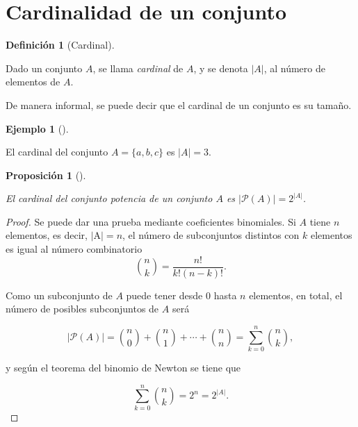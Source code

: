 \documentclass[
  a4paper,
]{scrreport}
\theoremstyle{definition}
\newtheorem{definition}{Definición}[chapter]
\theoremstyle{plain}
\theoremstyle{plain}
\newtheorem{proposition}{Proposición}[chapter]
\theoremstyle{definition}
\theoremstyle{definition}
\newtheorem{example}{Ejemplo}[chapter]
\theoremstyle{plain}
\theoremstyle{remark}
\begin{document}
\hypertarget{cardinalidad-de-un-conjunto}{%
\section{Cardinalidad de un
conjunto}\label{cardinalidad-de-un-conjunto}}

\begin{definition}[Cardinal]\protect\hypertarget{def-cardinal-conjunto}{}\label{def-cardinal-conjunto}

Dado un conjunto \(A\), se llama \emph{cardinal} de \(A\), y se denota
\(|A|\), al número de elementos de \(A\).

\end{definition}

De manera informal, se puede decir que el cardinal de un conjunto es su
tamaño.

\begin{example}[]\protect\hypertarget{exm-cardinal}{}\label{exm-cardinal}

El cardinal del conjunto \(A=\{a, b, c\}\) es \(|A|=3\).

\end{example}

\begin{proposition}[]\protect\hypertarget{prp-cardinal-conjunto-potencia}{}\label{prp-cardinal-conjunto-potencia}

El cardinal del conjunto potencia de un conjunto \(A\) es
\(|\mathcal{P}(A)| = 2^{|A|}\).

\end{proposition}

\begin{tcolorbox}[enhanced jigsaw, breakable, title=\textcolor{quarto-callout-note-color}{\faInfo}\hspace{0.5em}{Demostración}, toprule=.15mm, coltitle=black, arc=.35mm, rightrule=.15mm, colframe=quarto-callout-note-color-frame, colbacktitle=quarto-callout-note-color!10!white, toptitle=1mm, titlerule=0mm, leftrule=.75mm, opacityback=0, colback=white, bottomrule=.15mm, bottomtitle=1mm, left=2mm, opacitybacktitle=0.6]

\begin{proof}

Se puede dar una prueba mediante coeficientes binomiales. Si \(A\) tiene
\(n\) elementos, es decir, \(|\)A\(|=n\), el número de subconjuntos
distintos con \(k\) elementos es igual al número combinatorio
\[\binom{n}{k}=\frac{n!}{k!(n-k)!}.\]

Como un subconjunto de \(A\) puede tener desde \(0\) hasta \(n\)
elementos, en total, el número de posibles subconjuntos de \(A\) será

\[|\mathcal{P}(A)|=\binom{n}{0}+\binom{n}{1}+\cdots + \binom{n}{n} = \sum_{k=0}^n \binom{n}{k},\]

y según el teorema del binomio de Newton se tiene que

\[\sum_{k=0}^n \binom{n}{k}=2^n = 2^{|A|}.\]

\end{proof}

\end{tcolorbox}
\end{document}
